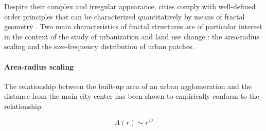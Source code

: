 \documentclass[10pt,letterpaper]{article}
\begin{document}
Despite their complex and irregular appearance, cities comply with well-defined order principles that can be characterized quantitatively by means of fractal geometry \cite{frankhauser1994fractalite, batty1994fractal}.
Two main characteristics of fractal structures are of particular interest in the context of the study of urbanization and land use change \cite{white2015modeling}: the area-radius scaling and the size-frequency distribution of urban patches.

\paragraph*{Area-radius scaling}
The relationship between the built-up area of an urban agglomeration and the distance from the main city center has been shown to empirically conform to the relationship:

\begin{equation}
  \label{eq:radial-dimension}
  A(r) \sim r^D
\end{equation}
\end{document}
